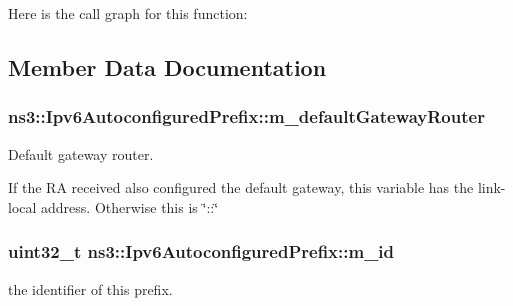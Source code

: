 Here is the call graph for this function\+:




\subsection{Member Data Documentation}
\subsubsection[{\texorpdfstring{m\+\_\+default\+Gateway\+Router}{m_defaultGatewayRouter}}]{ ns3\+::\+Ipv6\+Autoconfigured\+Prefix\+::m\+\_\+default\+Gateway\+Router\hspace{0.3cm}{\ttfamily [private]}}\hypertarget{classns3_1_1Ipv6AutoconfiguredPrefix_adda70a1fd6d52a2c1938a9f970c49e82}{}\label{classns3_1_1Ipv6AutoconfiguredPrefix_adda70a1fd6d52a2c1938a9f970c49e82}


Default gateway router. 

If the RA received also configured the default gateway, this variable has the link-\/local address. Otherwise this is \char`\"{}\+::\char`\"{} 
\subsubsection[{\texorpdfstring{m\+\_\+id}{m_id}}]{\setlength{\rightskip}{0pt plus 5cm}uint32\+\_\+t ns3\+::\+Ipv6\+Autoconfigured\+Prefix\+::m\+\_\+id\hspace{0.3cm}{\ttfamily [private]}}\hypertarget{classns3_1_1Ipv6AutoconfiguredPrefix_abcbef7fe5d4ebd9840756256b8c612b5}{}\label{classns3_1_1Ipv6AutoconfiguredPrefix_abcbef7fe5d4ebd9840756256b8c612b5}


the identifier of this prefix. 

